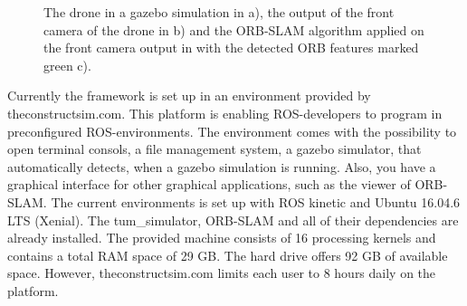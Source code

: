 	\begin{figure}%
    \centering
    \qquad
	\qquad
    \caption{
	The drone in a gazebo simulation in a), the output of the front camera of the drone in b) and
	the ORB-SLAM algorithm applied on the front camera output in with the detected ORB features marked green c).
	}%
    \label{fig:simfigs}%
	\end{figure}
	
	Currently the framework is set up in an environment provided by theconstructsim.com. This platform is enabling ROS-developers to program in preconfigured
	ROS-environments. The environment comes with the possibility to open terminal consols, a file management system, a gazebo simulator, that automatically 
	detects, when a gazebo simulation is running. Also, you have a graphical interface for other graphical applications, such as the viewer of ORB-SLAM.
	The current environments is set up with ROS kinetic and Ubuntu 16.04.6 LTS (Xenial). The tum\_simulator, ORB-SLAM and all of their dependencies are already installed. 
	The provided machine consists of 16 processing kernels and contains a total RAM space of 29 GB.  The hard drive offers 92 GB of available space. However, 
	theconstructsim.com limits each user to 8 hours daily on the platform. 
	

